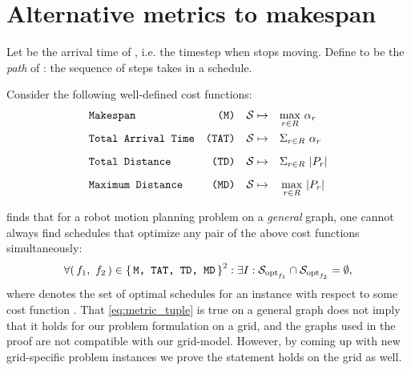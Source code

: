 \section{Alternative metrics to makespan}\label{chapter:alternative_metrics}


Let  be the arrival time of , i.e. the timestep when  stops moving. 
Define  to be the \emph{path} of : the sequence of steps  takes in a schedule. 

Consider the following well-defined cost functions:
\begin{align*}
	& \texttt{Makespan} 				& \texttt{(M)} && \mathcal{S} \mapsto \quad & \smash{\max_{r \in R}} \ \alpha_r 	\\[2mm] 
	& \texttt{Total Arrival Time} 	& \texttt{(TAT)} && \mathcal{S} \mapsto \quad & \Sigma_{r \in R} \ \alpha_r 		\\[2mm]
	& \texttt{Total Distance} 		& \texttt{(TD)} && \mathcal{S} \mapsto \quad & \Sigma_{r \in R} \ \lvert P_r\rvert 		\\[2mm]
	& \texttt{Maximum Distance} 		& \texttt{(MD)} && \mathcal{S} \mapsto \quad & \max_{r \in R} \ \lvert P_r\rvert
\end{align*}


\cite{corr/YuL15c} finds that for a robot motion planning problem on a \emph{general} graph, one cannot always find schedules that optimize any pair of the above cost functions simultaneously: 
\begin{align}\label{eq:metric_tuple}
	\forall (\, f_1,\ f_2 \,) \in \set{\texttt{M, TAT, TD, MD}}^2 : \exists I : \mathcal{S}_{\text{opt}_{f_1}} \cap \mathcal{S}_{\text{opt}_{f_2}} = \emptyset,
\end{align}
where  denotes the set of optimal schedules for an instance  with respect to some cost function . 
That \cref{eq:metric_tuple} is true on a general graph does not imply that it holds for our problem formulation on a grid, and the graphs used in the proof are not compatible with our grid-model. 
However, by coming up with new grid-specific problem instances we prove the statement holds on the grid as well.

